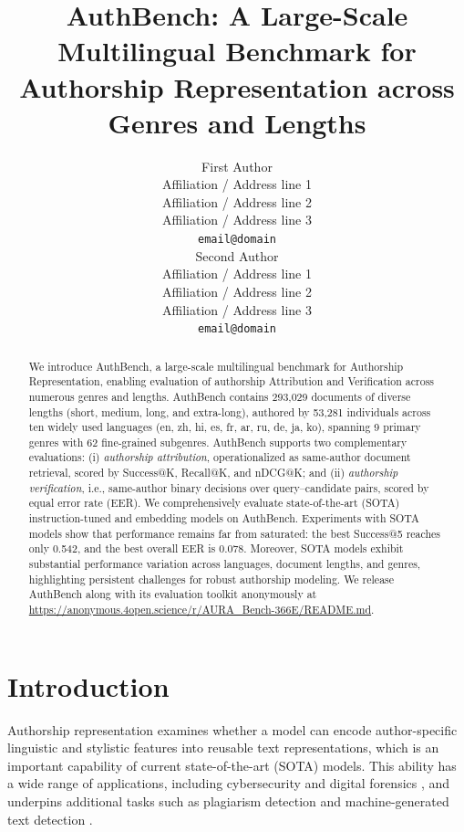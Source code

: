 \documentclass[11pt]{article}
\title{AuthBench: A Large-Scale Multilingual Benchmark for Authorship Representation across Genres and Lengths}
\author{First Author \\
  Affiliation / Address line 1 \\
  Affiliation / Address line 2 \\
  Affiliation / Address line 3 \\
  \texttt{email@domain} \\\And
  Second Author \\
  Affiliation / Address line 1 \\
  Affiliation / Address line 2 \\
  Affiliation / Address line 3 \\
  \texttt{email@domain} \\}
\begin{document}
\maketitle

\begin{abstract}
We introduce AuthBench, a large-scale multilingual benchmark for Authorship Representation, enabling evaluation of authorship Attribution and Verification across numerous genres and lengths. AuthBench contains 293,029 documents of diverse lengths (short, medium, long, and extra-long), authored by 53,281 individuals across ten widely used languages (en, zh, hi, es, fr, ar, ru, de, ja, ko), spanning 9 primary genres with 62 fine-grained subgenres. AuthBench supports two complementary evaluations: (i) \emph{authorship attribution}, operationalized as same-author document retrieval, scored by Success@K, Recall@K, and nDCG@K; and (ii) \emph{authorship verification}, i.e.,  same-author binary decisions over query--candidate pairs, scored by equal error rate (EER). We comprehensively evaluate state-of-the-art (SOTA) instruction-tuned and embedding models on AuthBench. Experiments with SOTA models show that performance remains far from saturated: the best Success@5 reaches only 0.542, and the best overall EER is 0.078. Moreover, SOTA models exhibit substantial performance variation across languages, document lengths, and genres, highlighting persistent challenges for robust authorship modeling. We release AuthBench along with its evaluation toolkit anonymously at \url{https://anonymous.4open.science/r/AURA_Bench-366E/README.md}.
\end{abstract}

\section{Introduction}
Authorship representation \cite{huang2025authorship,habib2025trends,tyo2022state} examines whether a model can encode author-specific linguistic and stylistic features into reusable text representations, which is an important capability of current state-of-the-art (SOTA) models. This ability has a wide range of applications, including cybersecurity and digital forensics \citep{abbasi2008writeprints,narayanan2012feasibility,kumar2017army,caliskan2015deanonymizing}, and underpins additional tasks such as plagiarism detection \citep{potthast2014panplagiarism,barron-cedeno-etal-2013-plagiarism} and machine-generated text detection \citep{przystalski2025stylometry,aityan2025lightweight,alshaibani2026arabic,martinek2024deepfakeads}.
\end{document}
